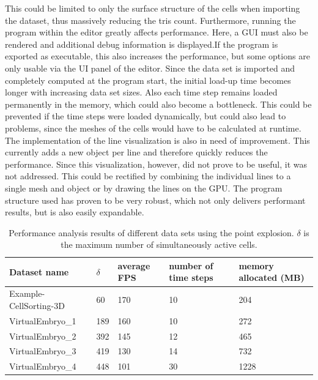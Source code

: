 This could be limited to only the surface structure of the cells when importing the dataset, thus massively reducing the tris count. Furthermore, running the program within the editor greatly affects performance. Here, a GUI must also be rendered and additional debug information is displayed.If the program is exported as executable, this also increases the performance, but some options are only usable via the UI panel of the editor. 
Since the data set is imported and completely computed at the program start, the initial load-up time becomes longer with increasing data set sizes. Also each time step remains loaded permanently in the memory, which could also become a bottleneck. This could be prevented if the time steps were loaded dynamically, but could also lead to problems, since the meshes of the cells would have to be calculated at runtime. The implementation of the line visualization is also in need of improvement. This currently adds a new object per line and therefore quickly reduces the performance. Since this visualization, however, did not prove to be useful, it was not addressed. This could be rectified by combining the individual lines to a single mesh and object or by drawing the lines on the GPU. The program structure used has proven to be very robust, which not only delivers performant results, but is also easily expandable.


\begin{table}[h]
	\centering
	\caption{Performance analysis results of different data sets using the point explosion. $\delta$ is the maximum number of simultaneously active cells.}
	\label{tab:performance}
	\renewcommand{\arraystretch}{1.3}
	\begin{tabular}{@{}lllll@{}}
		\toprule
		Dataset name          &    $\delta$     & average FPS     & number of time steps  & memory allocated (MB)            \\ \midrule
		Example-CellSorting-3D     & 60  & 170 & 10 &  204       \\ 
		VirtualEmbryo\_1 &  189  & 160  &  10 & 272  \\ 
		VirtualEmbryo\_2 & 392  &  145  &  12 & 465   \\
		VirtualEmbryo\_3 & 419 &  130 & 14 & 732  \\
		VirtualEmbryo\_4 & 448 & 101 & 30 & 1228  \\\bottomrule
	\end{tabular}
\end{table}

